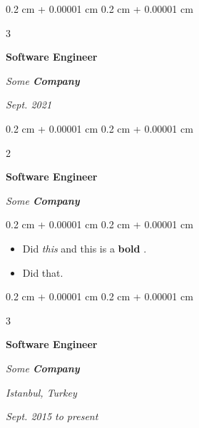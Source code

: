 \documentclass[10pt, letterpaper]{article}
\newenvironment{highlights}{
    \begin{itemize}[
        topsep=0.10 cm,
        parsep=0.10 cm,
        partopsep=0pt,
        itemsep=0pt,
        leftmargin=0.4 cm + 10pt + 0.6 cm
    ]
}{
    \end{itemize}
} %
\newenvironment{onecolentry}{
    \begin{adjustwidth}{
        0.2 cm + 0.00001 cm
    }{
        0.2 cm + 0.00001 cm
    }
}{
    \end{adjustwidth}
} %
\newenvironment{onecolentrybulleted}{
    \onecolentry
    \setcolumnwidth{0.6 cm, \fill}
    \begin{paracol}{2}
    \vspace*{\fill}
    \textbullet
    \vspace*{3px}
    \vspace*{\fill}
    \switchcolumn
}{
    \end{paracol}
    \endonecolentry
} %
\newenvironment{threecolentry}[3][]{
    \onecolentry
    \def\thirdColumn{#3}
    \setcolumnwidth{0.6 cm, \fill, 4.5 cm}
    \begin{paracol}{3}
    #2 \switchcolumn
}{
    \switchcolumn \raggedleft \thirdColumn
    \end{paracol}
    \endonecolentry
} %
\let\hrefWithoutArrow\href
\renewcommand{\href}[2]{\hrefWithoutArrow{#1}{\mbox{\ifthenelse{\equal{#2}{}}{ }{#2 }\raisebox{.15ex}{\footnotesize \faExternalLink*}}}}
\begin{document}
        \vspace{0.2 cm-3px}

        \begin{threecolentry}{
            \vspace*{\fill}
            \textbullet
            \vspace*{3px}
            \vspace*{\fill}
        }{
            
            
        \textit{Sept. 2021}}
            \textbf{Software Engineer}
            
            \textit{Some \textbf{Company}}
        \end{threecolentry}



        \vspace{0.2 cm-3px}

        \begin{onecolentrybulleted}
            \textbf{Software Engineer}
            
            \textit{Some \textbf{Company}}
        \end{onecolentrybulleted}

        \vspace{0.10 cm-3px}
        \begin{onecolentry}
            \begin{highlights}
                \item Did \textit{this} and this is a \textbf{bold} \href{https://example.com}{link}.
                \item Did that.
            \end{highlights}
        \end{onecolentry}


        \vspace{0.2 cm-3px}

        \begin{threecolentry}{
            \vspace*{\fill}
            \textbullet
            \vspace*{3px}
            \vspace*{\fill}
        }{
        \textit{Istanbul, Turkey}    
            
        \textit{Sept. 2015 to present}}
            \textbf{Software Engineer}
            
            \textit{Some \textbf{Company}}
        \end{threecolentry}
\end{document}

